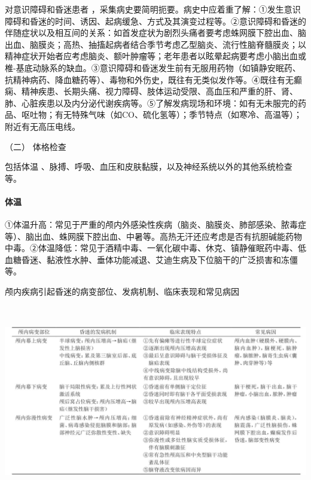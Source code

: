 对意识障碍和昏迷患者
，采集病史要简明扼要。病史中应着重了解：①发生意识障碍和昏迷的时间、诱因、起病缓急、方式及其演变过程等。②意识障碍和昏迷的伴随症状以及相互间的关系：如首发症状为剧烈头痛者要考虑蛛网膜下腔出血、脑出血、脑膜炎；高热、抽搐起病者结合季节考虑乙型脑炎、流行性脑脊髓膜炎；以精神症状开始者应考虑脑炎、额叶肿瘤等；老年患者以眩晕起病要考虑小脑出血或椎-基底动脉系的缺血。③意识障碍和昏迷发生前有无服用药物（如镇静安眠药、抗精神病药、降血糖药等）、毒物和外伤史，既往有无类似发作等。④既往有无癫痫、精神疾患、长期头痛、视力障碍、肢体运动受限、高血压和严重的肝、肾、肺、心脏疾患以及内分泌代谢疾病等。⑤了解发病现场和环境：如有无未服完的药品、呕吐物；有无特殊气味（如CO、硫化氢等）；季节特点（如寒冷、高温等）；附近有无高压电线。

\hypertarget{text00010.htmlux5cux23CHP1-2-2-1-2}{}
（二） 体格检查

包括体温
、脉搏、呼吸、血压和皮肤黏膜，以及神经系统以外的其他系统检查等。

\paragraph{体温}

①体温升高：常见于严重的颅内外感染性疾病（脑炎、脑膜炎、肺部感染、脓毒症等）、脑出血、蛛网膜下腔出血、中暑等。高热无汗还应考虑是否有抗胆碱能药物中毒。②体温降低：常见于酒精中毒、一氧化碳中毒、休克、镇静催眠药中毒、低血糖昏迷、黏液性水肿、垂体功能减退、艾迪生病及下位脑干的广泛损害和冻僵等。

\begin{table}[htbp]
\centering
\caption{颅内疾病引起昏迷的病变部位、发病机制、临床表现和常见病因}
\label{tab2-1}
\includegraphics[width=6.73958in,height=3.32292in]{./images/Image00004.jpg}
\end{table}

